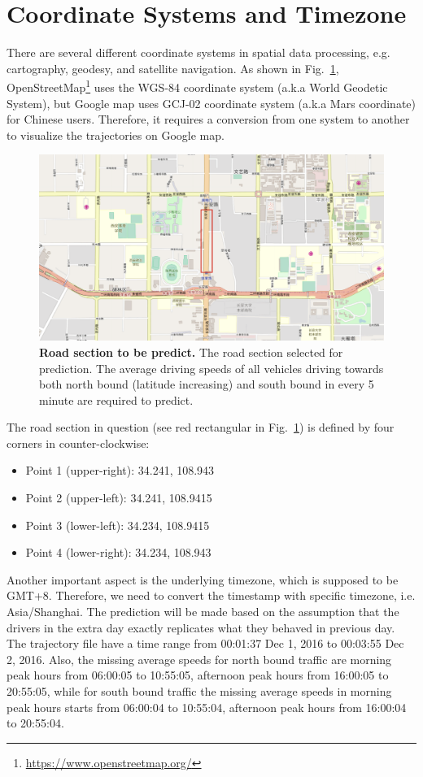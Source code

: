 \documentclass[12pt]{article}
\numberwithin{table}{section}
\begin{document}
\section*{Coordinate Systems and Timezone}
There are several different coordinate systems in spatial data processing, e.g. cartography, geodesy, and satellite navigation. As shown in Fig.~\ref{fig:roadsection}, OpenStreetMap\footnote{\href{https://www.openstreetmap.org/}{https://www.openstreetmap.org/}} uses the WGS-84 coordinate system (a.k.a World Geodetic System), but Google map uses GCJ-02 coordinate system (a.k.a Mars coordinate) for Chinese users. Therefore, it requires a conversion from one system to another to visualize the trajectories on Google map.

\begin{figure}[!h]
\centering
\includegraphics[width=\textwidth]{figs/XiAn}
\caption{\textbf{Road section to be predict.} The road section selected for prediction. The average driving speeds of all vehicles driving towards both north bound (latitude increasing) and south bound in every 5 minute are required to predict.} 
\label{fig:roadsection}
\end{figure}

The road section in question (see red rectangular in Fig.~\ref{fig:roadsection}) is defined by four corners in counter-clockwise:
\begin{itemize}
\item Point 1 (upper-right): 34.241, 108.943
\item Point 2 (upper-left): 34.241, 108.9415
\item Point 3 (lower-left): 34.234, 108.9415
\item Point 4 (lower-right): 34.234, 108.943
\end{itemize}

Another important aspect is the underlying timezone, which is supposed to be GMT+8. Therefore, we need to convert the timestamp with specific timezone, i.e. Asia/Shanghai. The prediction will be made based on the assumption that the drivers in the extra day exactly replicates what they behaved in previous day. The trajectory file have a time range from 00:01:37 Dec 1, 2016 to 00:03:55 Dec 2, 2016. Also, the missing average speeds for north bound traffic are morning peak hours from 06:00:05 to 10:55:05, afternoon peak hours from 16:00:05 to 20:55:05, while for south bound traffic the missing average speeds in morning peak hours starts from 06:00:04 to 10:55:04, afternoon peak hours from 16:00:04 to 20:55:04.
\end{document}
